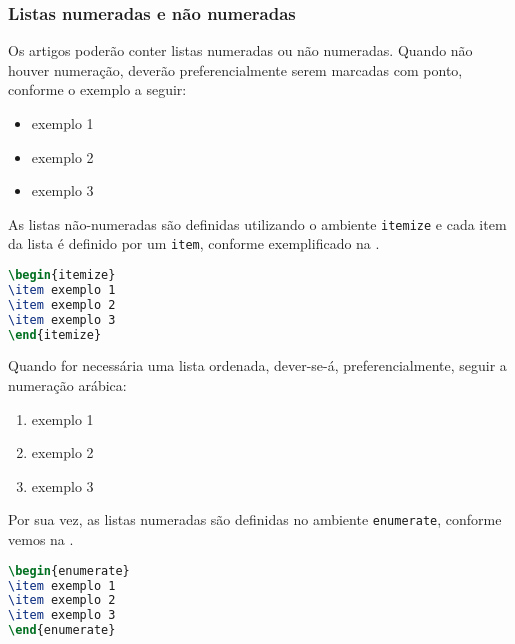 \documentclass{textolivre}
\begin{document}
\subsubsection{Listas numeradas e não numeradas}\label{sec-listas}
Os artigos poderão conter listas numeradas ou não numeradas.  
Quando não houver numeração, deverão preferencialmente serem marcadas com ponto, conforme o exemplo a seguir: 
\begin{itemize}
\item exemplo 1
\item exemplo 2
\item exemplo 3
\end{itemize}
As listas não-numeradas são definidas utilizando o ambiente \verb|itemize| e cada item da lista
é definido por um \verb|item|, conforme exemplificado na .
\begin{lstlisting}[language=tex, label=lst-itemize, caption={Listas não-numeradas.}]
\begin{itemize}
\item exemplo 1
\item exemplo 2
\item exemplo 3
\end{itemize}
\end{lstlisting} %

\lipsum[2]

Quando for necessária uma lista ordenada, dever-se-á, preferencialmente, seguir a numeração arábica:
\begin{enumerate}
\item exemplo 1
\item exemplo 2
\item exemplo 3
\end{enumerate}
Por sua vez, as listas numeradas são definidas no ambiente \verb|enumerate|, conforme vemos na .
\begin{lstlisting}[language=tex, label=lst-enum, caption={Listas numeradas.}, float]
\begin{enumerate}
\item exemplo 1
\item exemplo 2
\item exemplo 3
\end{enumerate}
\end{lstlisting} %

\lipsum[3]
\end{document}

